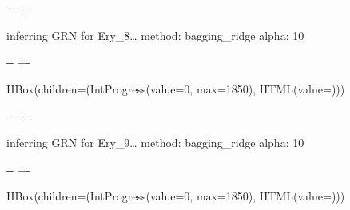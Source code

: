 \documentclass[letterpaper,10pt,english]{sphinxmanual}
\newlength\nbsphinxcodecellspacing
\begin{document}
%
{
\kern-\sphinxverbatimsmallskipamount\kern-\baselineskip
\kern+\FrameHeightAdjust\kern-\fboxrule
\vspace{\nbsphinxcodecellspacing}
%
\begin{sphinxVerbatim}[commandchars=\\\{\}]

inferring GRN for Ery\_8{\ldots}
method: bagging\_ridge
alpha: 10
\end{sphinxVerbatim}
}
\relax

{

\kern-\sphinxverbatimsmallskipamount\kern-\baselineskip
\kern+\FrameHeightAdjust\kern-\fboxrule
\vspace{\nbsphinxcodecellspacing}

%
\begin{sphinxVerbatim}[commandchars=\\\{\}]
HBox(children=(IntProgress(value=0, max=1850), HTML(value=\PYGZsq{}\PYGZsq{})))
\end{sphinxVerbatim}
}



%
{
\kern-\sphinxverbatimsmallskipamount\kern-\baselineskip
\kern+\FrameHeightAdjust\kern-\fboxrule
\vspace{\nbsphinxcodecellspacing}
%
\begin{sphinxVerbatim}[commandchars=\\\{\}]

inferring GRN for Ery\_9{\ldots}
method: bagging\_ridge
alpha: 10
\end{sphinxVerbatim}
}
\relax

{

\kern-\sphinxverbatimsmallskipamount\kern-\baselineskip
\kern+\FrameHeightAdjust\kern-\fboxrule
\vspace{\nbsphinxcodecellspacing}

%
\begin{sphinxVerbatim}[commandchars=\\\{\}]
HBox(children=(IntProgress(value=0, max=1850), HTML(value=\PYGZsq{}\PYGZsq{})))
\end{sphinxVerbatim}
}
\end{document}
